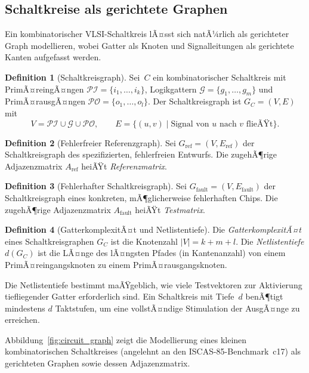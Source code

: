 ﻿\documentclass[a4paper,12pt]{article}
\theoremstyle{definition}
\newtheorem{definition}{Definition}
\begin{document}
\subsection{Schaltkreise als gerichtete Graphen}

Ein kombinatorischer VLSI-Schaltkreis lÃ¤sst sich natÃ¼rlich als gerichteter
Graph modellieren, wobei Gatter als Knoten und Signalleitungen als gerichtete
Kanten aufgefasst werden.

\begin{definition}[Schaltkreisgraph]
  \sloppy
  Sei~$C$ ein kombinatorischer Schaltkreis mit PrimÃ¤r\-eingÃ¤ngen
  $\mathcal{PI} = \{i_1, \ldots, i_k\}$, Logik\-gattern
  $\mathcal{G} = \{g_1, \ldots, g_m\}$ und PrimÃ¤r\-ausgÃ¤ngen
  $\mathcal{PO} = \{o_1, \ldots, o_l\}$.
  Der Schaltkreisgraph ist $G_C = (V, E)$ mit
  \[
    V = \mathcal{PI} \cup \mathcal{G} \cup \mathcal{PO}, \qquad
    E = \{(u, v) \mid \text{Signal von~$u$ nach~$v$ flieÃŸt}\}.
  \]
\end{definition}

\begin{definition}[Fehlerfreier Referenzgraph]
  Sei $G_{\mathrm{ref}} = (V, E_{\mathrm{ref}})$ der Schaltkreisgraph des
  spezifizierten, fehlerfreien Entwurfs. Die zugehÃ¶rige Adjazenzmatrix
  $A_{\mathrm{ref}}$ heiÃŸt \emph{Referenzmatrix}.
\end{definition}

\begin{definition}[Fehlerhafter Schaltkreisgraph]
  Sei $G_{\mathrm{fault}} = (V, E_{\mathrm{fault}})$ der Schaltkreisgraph
  eines konkreten, mÃ¶glicherweise fehlerhaften Chips. Die zugehÃ¶rige
  Adjazenzmatrix $A_{\mathrm{fault}}$ heiÃŸt \emph{Testmatrix}.
\end{definition}

\begin{definition}[GatterkomplexitÃ¤t und Netlistentiefe]
  Die \emph{GatterkomplexitÃ¤t} eines Schaltkreisgraphen $G_C$ ist die
  Knotenzahl $|V| = k + m + l$.
  Die \emph{Netlistentiefe} $d(G_C)$ ist die LÃ¤nge des lÃ¤ngsten Pfades
  (in Kantenanzahl) von einem PrimÃ¤reingangs\-knoten zu einem
  PrimÃ¤rausgangs\-knoten.
\end{definition}

Die Netlistentiefe bestimmt maÃŸgeblich, wie viele Testvektoren zur
Aktivierung tiefliegender Gatter erforderlich sind.
Ein Schaltkreis mit Tiefe~$d$ benÃ¶tigt mindestens $d$ Taktstufen, um eine
vollstÃ¤ndige Stimulation der AusgÃ¤nge zu erreichen.

Abbildung~\ref{fig:circuit_graph} zeigt die Modellierung eines kleinen
kombinatorischen Schaltkreises (angelehnt an den ISCAS-85-Benchmark~c17)
als gerichteten Graphen sowie dessen Adjazenzmatrix.
\end{document}
